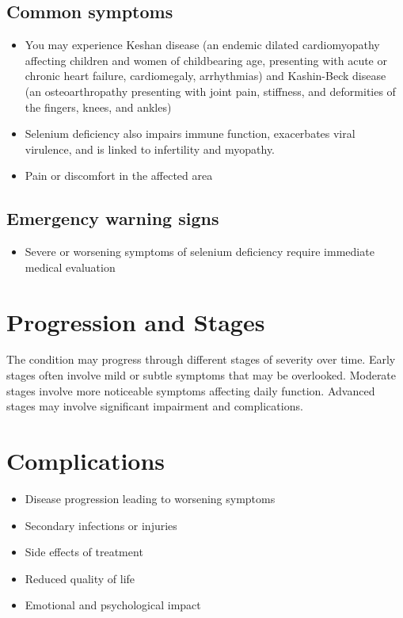 \subsection{Common symptoms}
\begin{itemize}[noitemsep]
  \item You may experience Keshan disease (an endemic dilated cardiomyopathy affecting children and women of childbearing age, presenting with acute or chronic heart failure, cardiomegaly, arrhythmias) and Kashin-Beck disease (an osteoarthropathy presenting with joint pain, stiffness, and deformities of the fingers, knees, and ankles)
  \item Selenium deficiency also impairs immune function, exacerbates viral virulence, and is linked to infertility and myopathy.
  \item Pain or discomfort in the affected area
  \end{itemize}
\subsection{Emergency warning signs}
\begin{itemize}[noitemsep]
  \item Severe or worsening symptoms of selenium deficiency require immediate medical evaluation
\end{itemize}
\section{Progression and Stages}
The condition may progress through different stages of severity over time. Early stages often involve mild or subtle symptoms that may be overlooked. Moderate stages involve more noticeable symptoms affecting daily function. Advanced stages may involve significant impairment and complications.
\section{Complications}
\begin{itemize}[noitemsep]
  \item Disease progression leading to worsening symptoms
  \item Secondary infections or injuries
  \item Side effects of treatment
  \item Reduced quality of life
  \item Emotional and psychological impact
\end{itemize}
